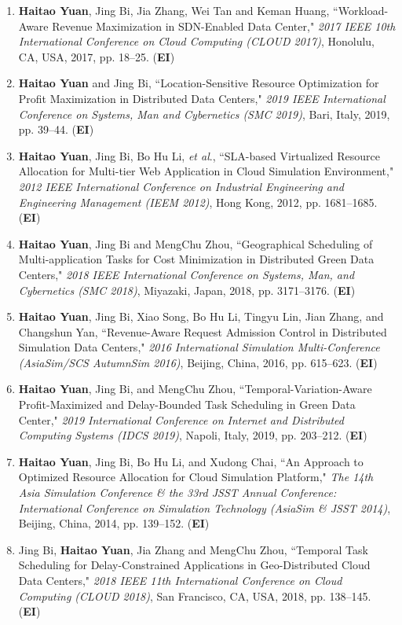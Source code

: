 \documentclass[margin,line]{res}
\begin{document}
\begin{resume}
\begin{enumerate}
\item \textbf{Haitao Yuan}, Jing Bi, Jia Zhang, Wei Tan and Keman Huang, ``Workload-Aware Revenue Maximization in SDN-Enabled Data Center," \emph{2017 IEEE 10th International Conference on Cloud Computing (CLOUD 2017)}, Honolulu, CA, USA, 2017, pp. 18--25. (\textbf{EI})
\item \textbf{Haitao Yuan} and Jing Bi, ``Location-Sensitive Resource Optimization for Profit Maximization in Distributed Data Centers," \emph{2019 IEEE International Conference on Systems, Man and Cybernetics (SMC 2019)}, Bari, Italy, 2019, pp. 39--44. (\textbf{EI})
\item \textbf{Haitao Yuan}, Jing Bi, Bo Hu Li, \textit{et al}., ``SLA-based Virtualized Resource Allocation for Multi-tier Web Application in Cloud Simulation Environment," \emph{2012 IEEE International Conference on Industrial Engineering and Engineering Management (IEEM 2012)}, Hong Kong, 2012, pp. 1681--1685. (\textbf{EI})
\item \textbf{Haitao Yuan}, Jing Bi and MengChu Zhou, ``Geographical Scheduling of Multi-application Tasks for Cost Minimization in Distributed Green Data Centers," \emph{2018 IEEE International Conference on Systems, Man, and Cybernetics (SMC 2018)}, Miyazaki, Japan, 2018, pp. 3171--3176. (\textbf{EI})
\item \textbf{Haitao Yuan}, Jing Bi, Xiao Song, Bo Hu Li, Tingyu Lin, Jian Zhang, and Changshun Yan, ``Revenue-Aware Request Admission Control in Distributed Simulation Data Centers," \emph{2016 International Simulation Multi-Conference (AsiaSim/SCS AutumnSim 2016)}, Beijing, China, 2016, pp. 615--623. (\textbf{EI})
\item \textbf{Haitao Yuan}, Jing Bi, and MengChu Zhou, ``Temporal-Variation-Aware Profit-Maximized and Delay-Bounded Task Scheduling in Green Data Center," \emph{2019 International Conference on Internet and Distributed Computing Systems (IDCS 2019)}, Napoli, Italy, 2019, pp. 203--212. (\textbf{EI})
\item \textbf{Haitao Yuan}, Jing Bi, Bo Hu Li, and Xudong Chai, ``An Approach to Optimized Resource Allocation for Cloud Simulation Platform," \emph{The 14th Asia Simulation Conference \& the 33rd JSST Annual Conference: International Conference on Simulation Technology (AsiaSim \& JSST 2014)}, Beijing, China, 2014, pp. 139--152. (\textbf{EI})
\item Jing Bi, \textbf{Haitao Yuan}, Jia Zhang and MengChu Zhou, ``Temporal Task Scheduling for Delay-Constrained Applications in Geo-Distributed Cloud Data Centers," \emph{2018 IEEE 11th International Conference on Cloud Computing (CLOUD 2018)}, San Francisco, CA, USA, 2018, pp. 138--145. (\textbf{EI})

\end{enumerate}
\end{resume}
\end{document}
